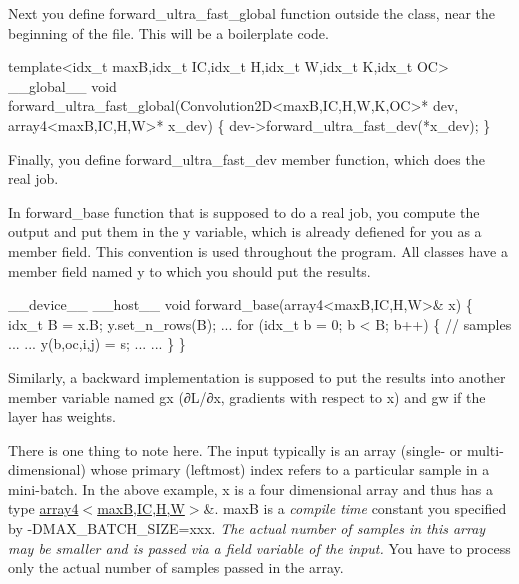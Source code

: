 Next you define forward\+\_\+ultra\+\_\+fast\+\_\+global function outside the class, near the beginning of the file. This will be a boilerplate code.


\begin{DoxyCode}
template<idx\_t maxB,idx\_t IC,idx\_t H,idx\_t W,idx\_t K,idx\_t OC>
\_\_global\_\_ void forward\_ultra\_fast\_global(Convolution2D<maxB,IC,H,W,K,OC>* dev,
                                          array4<maxB,IC,H,W>* x\_dev) \{
  dev->forward\_ultra\_fast\_dev(*x\_dev);
\}
\end{DoxyCode}


Finally, you define forward\+\_\+ultra\+\_\+fast\+\_\+dev member function, which does the real job.

In forward\+\_\+base function that is supposed to do a real job, you compute the output and put them in the \textquotesingle{}y\textquotesingle{} variable, which is already defiened for you as a member field. This convention is used throughout the program. All classes have a member field named \textquotesingle{}y\textquotesingle{} to which you should put the results.


\begin{DoxyCode}
\_\_device\_\_ \_\_host\_\_ 
void forward\_base(array4<maxB,IC,H,W>& x) \{
  idx\_t B = x.B;
  y.set\_n\_rows(B);
  ...
  for (idx\_t b = 0; b < B; b++) \{       // samples
    ...
       ...
          y(b,oc,i,j) = s;
       ...
    ...
  \}
\}
\end{DoxyCode}


Similarly, a backward implementation is supposed to put the results into another member variable named \textquotesingle{}gx\textquotesingle{} (∂\+L/∂x, gradients with respect to x) and \textquotesingle{}gw\textquotesingle{} if the layer has weights.

There is one thing to note here. The input typically is an array (single-\/ or multi-\/dimensional) whose primary (leftmost) index refers to a particular sample in a mini-\/batch. In the above example, x is a four dimensional array and thus has a type \hyperlink{structarray4}{array4$<$max\+B,\+I\+C,\+H,\+W$>$}\&. maxB is a {\itshape compile time} constant you specified by -\/\+D\+M\+A\+X\+\_\+\+B\+A\+T\+C\+H\+\_\+\+S\+I\+ZE=xxx. {\itshape The actual number of samples in this array may be smaller and is passed via a field variable of the input.} You have to process only the actual number of samples passed in the array.


